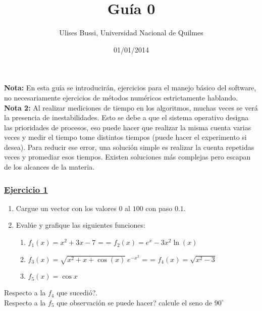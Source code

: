 \documentclass[a4paper,11pt]{article}
\makeatletter
\theoremstyle{mytheor}
\renewcommand{\maketitle}{
\colorbox{gray!20}{\framebox[\linewidth]{ \huge \textsc{\@title} } 
\lfoot{\@title}
}

}
\newcommand{\inlineitem}[1][]{%
\ifnum\enit@type=\tw@
    {\descriptionlabel{#1}}
  \hspace{\labelsep}
\else
  \ifnum\enit@type=\z@
       \refstepcounter{\@listctr}\fi
    \quad\@itemlabel\hspace{\labelsep}
\fi}
\makeatother
\begin{document}
\title{Guía 0}

\author{Ulises Bussi, Universidad Nacional de Quilmes}

\date{01/01/2014}

\maketitle \vspace{20pt}


\textbf{Nota: } En esta guía se introducirán, ejercicios para el manejo básico del software, no necesariamente ejercicios de métodos numéricos estrictamente hablando.\\

\textbf{Nota 2: } Al realizar mediciones de tiempo en los algoritmos, muchas veces se verá la presencia de inestabilidades. Esto se debe a que el sistema operativo designa las prioridades de procesos, eso puede hacer que realizar la misma cuenta varias veces y medir el tiempo tome distintos tiempos (puede hacer el experimento si desea). Para reducir ese error, una solución simple es realizar la cuenta repetidas veces y promediar esos tiempos. Existen soluciones más complejas pero escapan de los alcances de la materia. 

\subsubsection*{\underline{Ejercicio 1}}

\begin{enumerate}[label=\alph*.]
 \item Cargue un vector con los valores $0$ al $100$ con paso $0.1$.
 \item Evalúe y grafique las siguientes funciones:
 \begin{enumerate}[label=\roman*.]
   \item $f_1(x) =x^2 +3x -7$  \hspace{115pt} \inlineitem $f_2(x) = e^x - 3x^2 \ln(x)$
   \item $f_3(x) = \sqrt{x^2+x+\cos(x)}\ e^{-x^2}$ \hspace{65pt} \inlineitem $f_4(x) = \sqrt{x^2 -3}$
   \item $f_5(x) = \cos x$
 \end{enumerate}
\end{enumerate}
Respecto a la $f_4$ que sucedió?.\\
Respecto a la $f_5$ que observación se puede hacer?  calcule el seno de $90^\circ$
\end{document}
